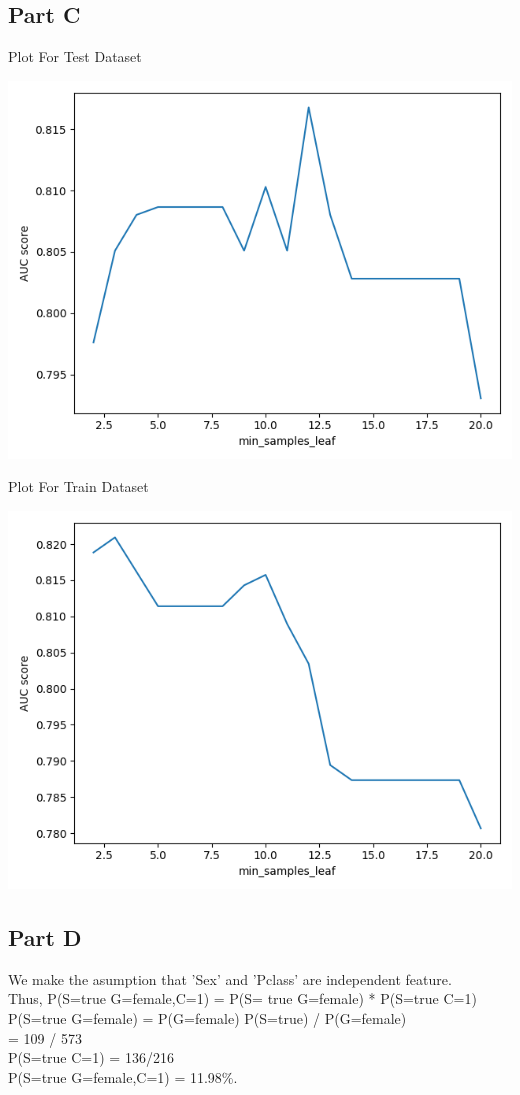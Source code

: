 \documentclass[12pt]{article}
\begin{document}
    \subsection{Part C}\label{subsec:part-c2}
    \begin{center}
        Plot For Test Dataset
    \end{center}
    \includegraphics[scale=0.8]{../Plot/plot_test.png}
    \begin{center}
        Plot For Train Dataset
    \end{center}
    \includegraphics[scale=0.8]{../Plot/plot_train.png}
    \subsection{Part D}\label{subsec:part-d}
    We make the asumption that 'Sex' and 'Pclass' are independent feature. \\
    Thus, {\fontsize{9} P(S=true \lvert G=female,C=1)  = P(S= true \lvert G=female) *
    P(S=true \lvert C=1)} \\
    P(S=true \lvert G=female) = P(G=female) \cap P(S=true) / P(G=female) \\
    = 109 / 573 \\
    P(S=true \lvert C=1) = 136/216 \\
    P(S=true \lvert G=female,C=1) = 11.98\%.
\end{document}

